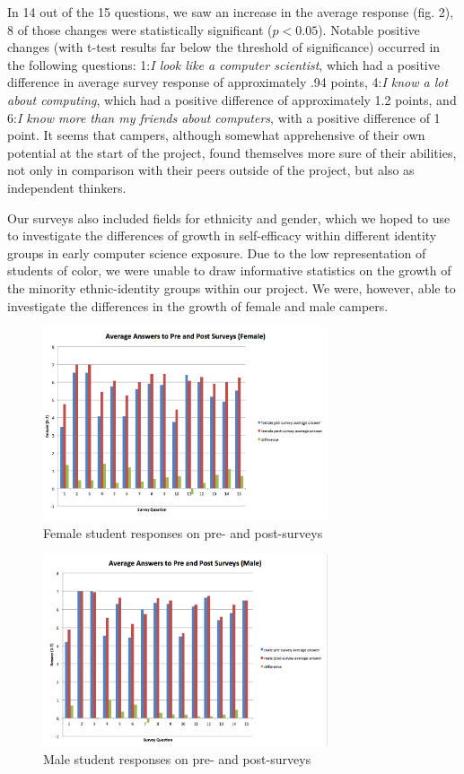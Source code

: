 In 14 out of the 15 questions, we saw an increase in the
average response (fig. 2), 8 of those changes were statistically
significant ($p < 0.05$). Notable positive changes (with t-test
results far below the threshold of significance) occurred in the
following questions: 1:\textit{I look like a computer scientist}, which
had a positive difference in average survey response of approximately
.94 points, 4:\textit{I know a lot about computing}, which had a positive
difference of approximately 1.2 points, and 6:\textit{I know more than
my friends about computers}, with a positive difference of 1 point.
It seems that campers, although somewhat apprehensive of their own
potential at the start of the project, found themselves more sure
of their abilities, not only in comparison with their peers outside
of the project, but also as independent thinkers.

Our surveys also included fields for ethnicity and gender, which
we hoped to use to investigate the differences of growth in
self-efficacy within different identity groups in early computer
science exposure. Due to the low representation of students of
color, we were unable to draw informative statistics on the growth
of the minority ethnic-identity groups within our project. We were,
however, able to investigate the differences in the growth of female
and male campers.

\begin{figure}
\includegraphics[width=3.3in]{images/AvgAnswersFemale}
\caption{Female student responses on pre- and post-surveys}
\end{figure}

\begin{figure}
\includegraphics[width=3.3in]{images/AvgAnswersMale}
\caption{Male student responses on pre- and post-surveys}
\end{figure}

